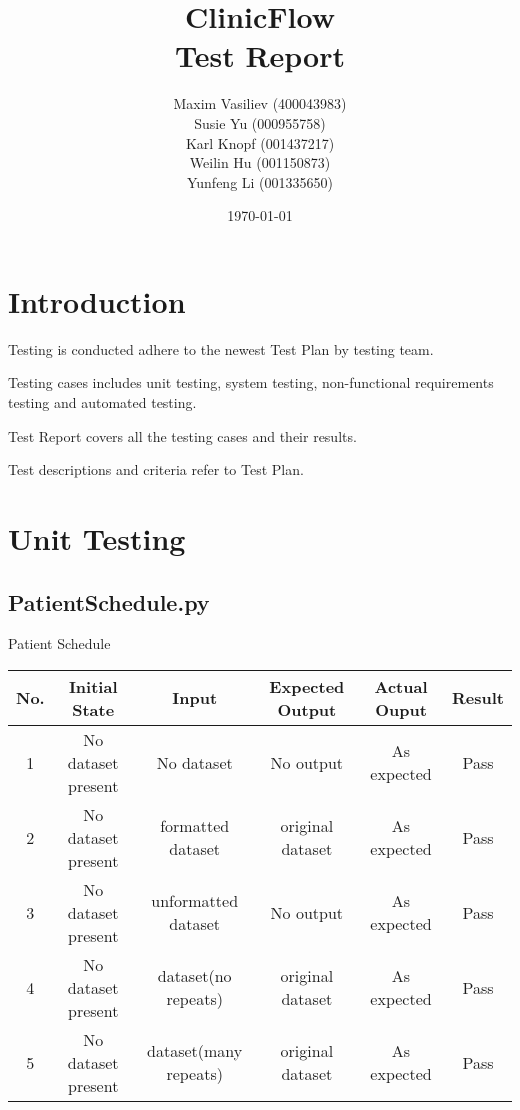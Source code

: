 \documentclass[12pt]{article}
\title{
ClinicFlow
\\\vspace{10mm}
\Large \textbf{Test Report}
\vspace{40mm}
}
\author{ Maxim Vasiliev (400043983)
\\
Susie Yu \quad (000955758)
\\
Karl Knopf \quad (001437217)
\\
Weilin Hu \quad (001150873)
\\
Yunfeng Li \quad (001335650)
}
\date{\today}
\begin{document}
\maketitle
\newpage
\tableofcontents
\newpage
{}
\setlength\parindent{0pt}


\section{Introduction}

Testing is conducted adhere to the newest Test Plan by testing team. 

Testing cases includes unit testing, 
system testing, non-functional requirements testing and automated testing. 

Test Report covers all the testing cases and their results. 

Test descriptions and criteria refer to Test Plan. 

\quad

\quad

\quad

\quad

\section{Unit Testing}

\quad


\subsection{PatientSchedule.py}


\vspace{-5pt}

Patient Schedule

\vspace{10pt}

\begin{tabular}{|c|c|c|c|c|c|}
\hline
\textbf{No.}  & \textbf{Initial State} & \textbf{Input} & \textbf{Expected Output} & \textbf{Actual Ouput} & \textbf{Result}
\\ \hline
1  & No dataset present & No dataset & No output & As expected & Pass
\\ \hline
2  & No dataset present & formatted dataset & original dataset & As expected & Pass
\\ \hline
3  & No dataset present & unformatted dataset & No output & As expected & Pass
\\ \hline
4  & No dataset present & dataset(no repeats) & original dataset & As expected & Pass
\\ \hline
5  & No dataset present & dataset(many repeats) & original dataset & As expected & Pass
\\ \hline
\end{tabular}\\
\end{document}
